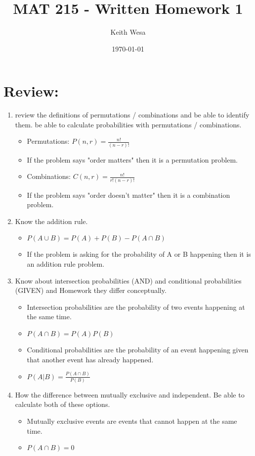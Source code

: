 \documentclass{article}
\author{Keith Wesa}
\title{MAT 215 - Written Homework 1}
\date{\today}
\begin{document}
\section*{\textbf{Review:}}
\begin{enumerate}
    \item review the definitions of permutations / combinations and be able to identify them.
    be able to calculate probabilities with permutations / combinations.
    \begin{itemize}
        \item Permutations: $P(n,r) = \frac{n!}{(n-r)!}$
        \item If the problem says "order matters" then it is a permutation problem.
        \item Combinations: $C(n,r) = \frac{n!}{r!(n-r)!}$ 
        \item If the problem says "order doesn't matter" then it is a combination problem.
    \end{itemize}
    \item Know the addition rule.
    \begin{itemize}
        \item $P(A \cup B) = P(A) + P(B) - P(A \cap B)$
        \item If the problem is asking for the probability of A or B happening then it is an addition rule problem.
    \end{itemize}
    \item Know about intersection probabilities (AND) and conditional probabilities (GIVEN) and Homework
    they differ conceptually.
    \begin{itemize}
        \item Intersection probabilities are the probability of two events happening at the same time.
        \item $P(A \cap B) = P(A)P(B)$
        \item Conditional probabilities are the probability of an event happening given that another event has already happened.
        \item $P(A|B) = \frac{P(A \cap B)}{P(B)}$
    \end{itemize}
   \item How the difference between mutually exclusive and independent. Be able to calculate both of these options.
    \begin{itemize}
         \item Mutually exclusive events are events that cannot happen at the same time.
         \item $P(A \cap B) = 0$

\end{itemize}
\end{enumerate}
\end{document}
